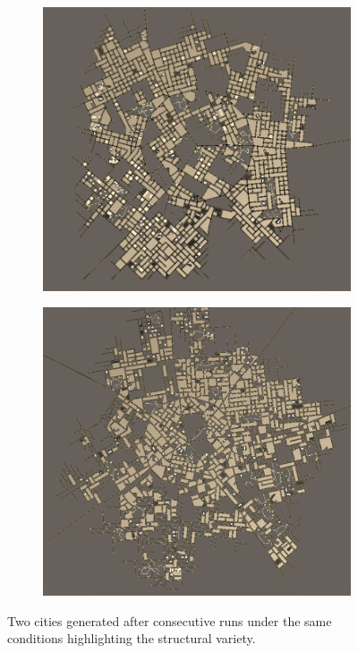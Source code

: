 \begin{figure}[h!]
  \centering
  \begin{subfigure}[b]{0.455\textwidth}
    \includegraphics[width=\textwidth]{figure/discussion_city_layout_1}
  \end{subfigure}
  \quad
  \begin{subfigure}[b]{0.45\textwidth}
    \includegraphics[width=\textwidth]{figure/discussion_city_layout_2}
  \end{subfigure}
  \caption{Two cities generated after consecutive runs under the same conditions highlighting the structural variety.}
  \label{fig:discussion_city_layout_variety}
\end{figure}

